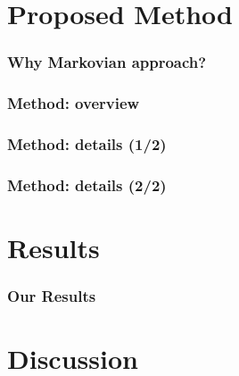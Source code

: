 \documentclass[aspectratio=169,xcolor=x11names,compress]{beamer}
\begin{document}
\section{Proposed Method}

\begin{frame}
\frametitle{Why Markovian approach?}
\end{frame}

\begin{frame}
\frametitle{Method: overview}
\end{frame}

\begin{frame}
\frametitle{Method: details (1/2)}
\end{frame}

\begin{frame}
\frametitle{Method: details (2/2)}
\end{frame}

\section{Results}

\begin{frame}
\frametitle{Our Results}
\end{frame}

\section{Discussion}
\end{document}
